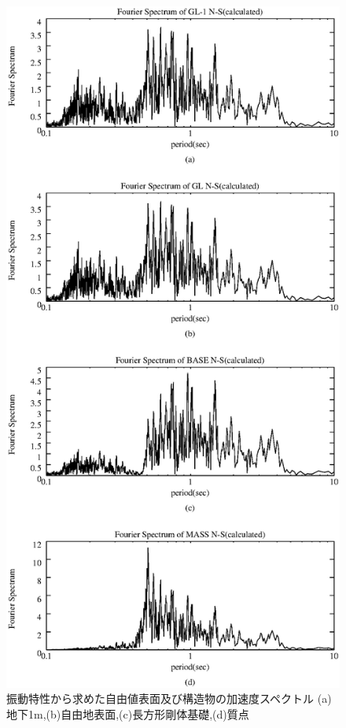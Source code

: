 \documentclass[titlepage]{jsarticle}
\begin{document}
\begin{figure}[htbp]
\begin{center}
\includegraphics[scale=0.6]{Skaiseki.eps}
\caption[解析波形のスペクトル]{振動特性から求めた自由値表面及び構造物の加速度スペクトル
	(a)地下1m,(b)自由地表面,(c)長方形剛体基礎,(d)質点}
\label{transspec}
\end{center}
\end{figure}
\end{document}
